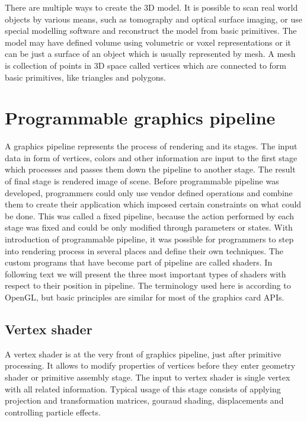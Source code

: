 There are multiple ways to create the 3D model. It is possible to scan real
world objects by various means, such as tomography and optical surface imaging,
or use special modelling software and reconstruct the model from basic
primitives. The model may have defined volume using volumetric or voxel
representations or it can be just a surface of an object which is usually
represented by mesh. A mesh is collection of points in 3D space called vertices
which are connected to form basic primitives, like triangles and polygons.

\section{Programmable graphics pipeline}
A graphics pipeline represents the process of rendering and its stages. The
input data in form of vertices, colors and other information are input to the
first stage which processes and passes them down the pipeline to another stage.
The result of final stage is rendered image of scene. Before programmable
pipeline was developed, programmers could only use vendor defined operations and
combine them to create their application which imposed certain constraints on
what could be done. This was called a fixed pipeline, because the action
performed by each stage was fixed and could be only modified through parameters
or states. With introduction of programmable pipeline, it was possible for
programmers to step into rendering process in several places and define their
own techniques. The custom programs that have become part of pipeline are called
shaders. In following text we will present the three most important types of
shaders with respect to their position in pipeline. The terminology used here is
according to OpenGL, but basic principles are similar for most of the graphics
card APIs.

\subsection{Vertex shader}
A vertex shader is at the very front of graphics pipeline, just after primitive
processing. It allows to modify properties of vertices before they enter
geometry shader or primitive assembly stage. The input to vertex shader is
single vertex with all related information. Typical usage of this stage consists
of applying projection and transformation matrices, gouraud shading,
displacements and controlling particle effects.

